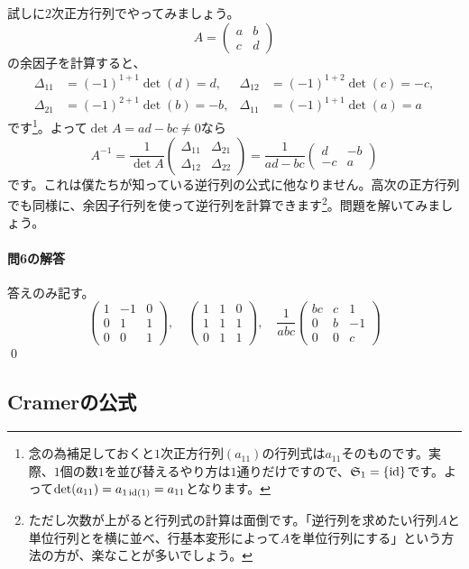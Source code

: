 試しに$2$次正方行列でやってみましょう。
\[
A =
\begin{pmatrix}
a & b \\
c & d
\end{pmatrix}
\]
の余因子を計算すると、
\begin{align*}
\Delta_{11} &= (-1)^{1 + 1} \det(d) = d, &
\Delta_{12} &= (-1)^{1 + 2} \det(c) = -c, \\
\Delta_{21} &= (-1)^{2 + 1} \det(b) = -b, &
\Delta_{11} &= (-1)^{1 + 1} \det(a) = a
\end{align*}
です\footnote{念の為補足しておくと$1$次正方行列$(a_{11})$の行列式は$a_{11}$そのものです。実際、$1$個の数$1$を並び替えるやり方は$1$通りだけですので、$\mathfrak{S}_1 = \{\operatorname{id}\}$です。よって$\det (a_{11}) = a_{1 \operatorname{id}(1)} = a_{11}$となります。}。よって$\det A = ad - bc \neq 0$なら
\[
A^{-1}
= \frac{1}{\det A}
\begin{pmatrix}
\Delta_{11} & \Delta_{21} \\
\Delta_{12} & \Delta_{22}
\end{pmatrix}
= \frac{1}{ad - bc}
\begin{pmatrix}
d & -b \\
-c & a
\end{pmatrix}
\]
です。これは僕たちが知っている逆行列の公式に他なりません。高次の正方行列でも同様に、余因子行列を使って逆行列を計算できます\footnote{ただし次数が上がると行列式の計算は面倒です。「逆行列を求めたい行列$A$と単位行列とを横に並べ、行基本変形によって$A$を単位行列にする」という方法の方が、楽なことが多いでしょう。}。問題を解いてみましょう。

\paragraph{問6の解答} 答えのみ記す。
\[
\begin{pmatrix}
1 & -1 & 0 \\
0 & 1 & 1 \\
0 & 0 & 1
\end{pmatrix}, \quad
\begin{pmatrix}
1 & 1 & 0 \\
1 & 1 & 1 \\
0 & 1 & 1
\end{pmatrix}, \quad
\frac{1}{abc}
\begin{pmatrix}
bc & c & 1 \\
0 & b & -1 \\
0 & 0 & c
\end{pmatrix}
\]
\qed

\subsection{Cramerの公式}

